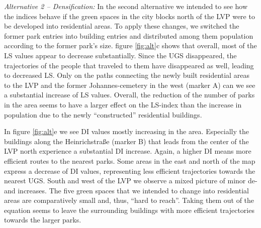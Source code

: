 \documentclass[10pt]{article}
\begin{document}
\textit{Alternative 2 – Densification:} In the second alternative we intended to see how the indices behave if the green spaces in the city blocks north of the LVP were to be developed into residential areas.
To apply these changes, we switched the former park entries into building entries and distributed among them population according to the former park’s size.
figure \ref{fig:alt}c shows that overall, most of the LS values appear to decrease substantially. 
Since the UGS disappeared, the trajectories of the people that traveled to them have disappeared as well, leading to decreased LS.
Only on the paths connecting the newly built residential areas to the LVP and the former Johannes-cemetery in the west (marker A) can we see a substantial increase of LS values.
Overall, the reduction of the number of parks in the area seems to have a larger effect on the LS-index than the increase in population due to the newly “constructed” residential buildings. 

In figure \ref{fig:alt}e we see DI values mostly increasing in the area. 
Especially the buildings along the Heinrichstraße (marker B) that leads from the center of the LVP north experience a substantial DI increase.
Again, a higher DI means more efficient routes to the nearest parks.
Some areas in the east and north of the map express a decrease of DI values, representing less efficient trajectories towards the nearest UGS.
South and west of the LVP we observe a mixed picture of minor de- and increases.
The five green spaces that we intended to change into residential areas are comparatively small and, thus, “hard to reach”.
Taking them out of the equation seems to leave the surrounding buildings with more efficient trajectories towards the larger parks.
\end{document}
